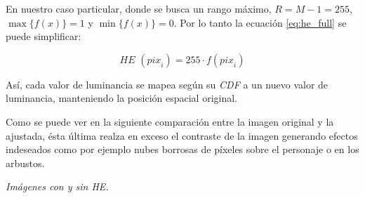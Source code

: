 En nuestro caso particular, donde se busca un rango máximo, $R = M - 1 = 255$,
$\max\{f(x)\} = 1$ y $\min\{f(x)\} = 0$. Por lo tanto la ecuación
\eqref{eq:he_full} se puede simplificar:

\begin{equation} \label{eq:he}
	\textit{HE } ({pix}_i) = 255 \cdot f({pix}_i)
\end{equation}

Así, cada valor de luminancia se mapea según su \emph{CDF} a un nuevo valor de
luminancia, manteniendo la posición espacial original.


Como se puede ver en la siguiente comparación entre la imagen original y la
ajustada, ésta última realza en exceso el contraste de la imagen generando
efectos indeseados como por ejemplo nubes borrosas de píxeles sobre el personaje
o en los arbustos.

\noindent
\begin{minipage}{\columnwidth}
	\makeatletter
	\newcommand{\@captype}{figure}
	\makeatother
	\centering
		\qquad%
	\caption{\emph{Imágenes con y sin HE.}}
\end{minipage}
